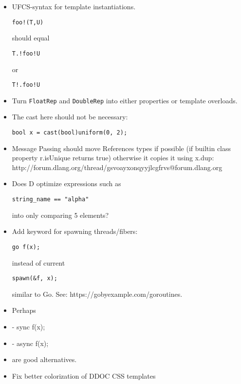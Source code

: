 \documentclass[xcolor=dvipsnames, twocolumn]{article}
\begin{document}
\begin{itemize}

\item UFCS-syntax for template instantiations.
\begin{lstlisting}[frame=single]
foo!(T,U)
\end{lstlisting}

should equal

\begin{lstlisting}[frame=single]
T.!foo!U
\end{lstlisting}

or

\begin{lstlisting}[frame=single]
T!.foo!U
\end{lstlisting}

\item Turn \texttt{FloatRep} and \texttt{DoubleRep} into either properties or
  template overloads.

\item The cast here should not be necessary:
\begin{lstlisting}[frame=single]
bool x = cast(bool)uniform(0, 2);
\end{lstlisting}

\item Message Passing should move References types if possible (if builtin class
  property r.isUnique returns true) otherwise it copies it using x.dup:
  http://forum.dlang.org/thread/gsvoayxonqyyjlcgfrvs@forum.dlang.org

\item Does D optimize expressions such as
\begin{lstlisting}[frame=single]
string_name == "alpha"
\end{lstlisting}
into only comparing 5 elements?

\item Add keyword for spawning threads/fibers:
\begin{lstlisting}[frame=single]
go f(x);
\end{lstlisting}
instead of current
\begin{lstlisting}[frame=single]
spawn(&f, x);
\end{lstlisting}
similar to Go. See: https://gobyexample.com/goroutines.

\item Perhaps
\item - sync f(x);
\item - async f(x);
\item are good alternatives.

\item Fix better colorization of DDOC CSS templates

\end{itemize}
\end{document}
